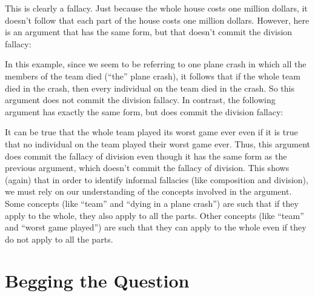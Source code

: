 \begin{kormanize}
\end{kormanize}

This is clearly a fallacy. Just because the whole house costs one million dollars, it doesn't follow that each part of the house costs one million dollars. However, here is an argument that has the same form, but that doesn't commit the division
fallacy:

\begin{kormanize}
\end{kormanize}

In this example, since we seem to be referring to one plane crash in which all the members of the team died (``the'' plane crash), it follows that if the whole team died in the crash, then every individual on the team died in the crash. So this argument does not commit the division fallacy. In contrast, the following argument has exactly the same form, but does commit the division fallacy:

\begin{kormanize}
\end{kormanize}

It can be true that the whole team played its worst game ever even if it is true that no individual on the team played their worst game ever. Thus, this argument does commit the fallacy of division even though it has the same form as the previous argument, which doesn't commit the fallacy of division. This shows (again) that in order to identify informal fallacies (like composition and division), we must rely on our understanding of the concepts involved in the argument. Some concepts (like ``team'' and ``dying in a plane crash'') are such that if they apply to the whole, they also apply to all the parts. Other concepts (like ``team'' and ``worst game played'') are such that they can apply to the whole even if they do not apply to all the parts.

\section{Begging the Question}\label{sec:beggingthequestion}

